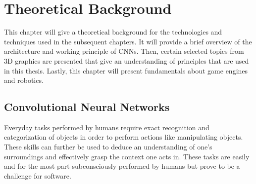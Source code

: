 \chapter{Theoretical Background}
This chapter will give a theoretical background for the technologies and techniques used in the subsequent chapters. It will provide a brief overview of the architecture and working principle of \acp{CNN}. Then, certain selected topics from 3D graphics are presented that give an understanding of principles that are used in this thesis. Lastly, this chapter will present fundamentals about game engines and robotics.

\section{Convolutional Neural Networks}
Everyday tasks performed by humans require exact recognition and categorization of objects in order to perform actions like manipulating objects. 
These skills can further be used to deduce an understanding of one's surroundings and effectively grasp the context one acts in. These tasks are easily and for the most part subconsciously performed by humans but prove to be a challenge for software.\

